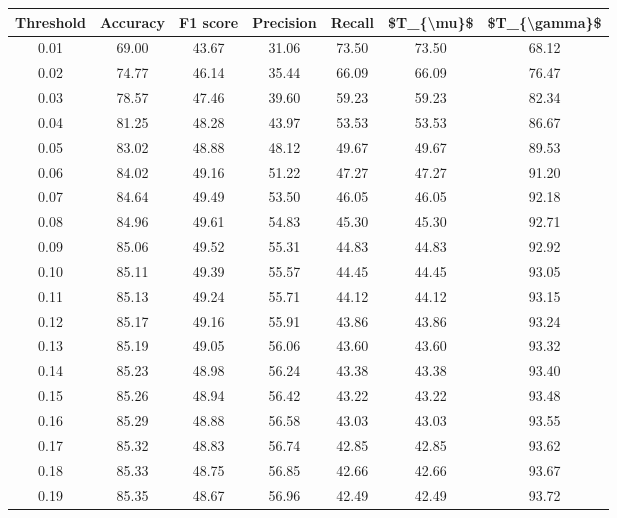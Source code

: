 \begin{tabular}{|c|c|c|c|c|c|c|}
\toprule
 Threshold &  Accuracy &  F1 score &  Precision &  Recall &  \$T\_\{\textbackslash mu\}\$ &  \$T\_\{\textbackslash gamma\}\$ \\
\hline
      0.01 &     69.00 &     43.67 &      31.06 &   73.50 &      73.50 &         68.12 \\
      0.02 &     74.77 &     46.14 &      35.44 &   66.09 &      66.09 &         76.47 \\
      0.03 &     78.57 &     47.46 &      39.60 &   59.23 &      59.23 &         82.34 \\
      0.04 &     81.25 &     48.28 &      43.97 &   53.53 &      53.53 &         86.67 \\
      0.05 &     83.02 &     48.88 &      48.12 &   49.67 &      49.67 &         89.53 \\
      0.06 &     84.02 &     49.16 &      51.22 &   47.27 &      47.27 &         91.20 \\
      0.07 &     84.64 &     49.49 &      53.50 &   46.05 &      46.05 &         92.18 \\
      0.08 &     84.96 &     49.61 &      54.83 &   45.30 &      45.30 &         92.71 \\
      0.09 &     85.06 &     49.52 &      55.31 &   44.83 &      44.83 &         92.92 \\
      0.10 &     85.11 &     49.39 &      55.57 &   44.45 &      44.45 &         93.05 \\
      0.11 &     85.13 &     49.24 &      55.71 &   44.12 &      44.12 &         93.15 \\
      0.12 &     85.17 &     49.16 &      55.91 &   43.86 &      43.86 &         93.24 \\
      0.13 &     85.19 &     49.05 &      56.06 &   43.60 &      43.60 &         93.32 \\
      0.14 &     85.23 &     48.98 &      56.24 &   43.38 &      43.38 &         93.40 \\
      0.15 &     85.26 &     48.94 &      56.42 &   43.22 &      43.22 &         93.48 \\
      0.16 &     85.29 &     48.88 &      56.58 &   43.03 &      43.03 &         93.55 \\
      0.17 &     85.32 &     48.83 &      56.74 &   42.85 &      42.85 &         93.62 \\
      0.18 &     85.33 &     48.75 &      56.85 &   42.66 &      42.66 &         93.67 \\
      0.19 &     85.35 &     48.67 &      56.96 &   42.49 &      42.49 &         93.72 \\

\end{tabular}
